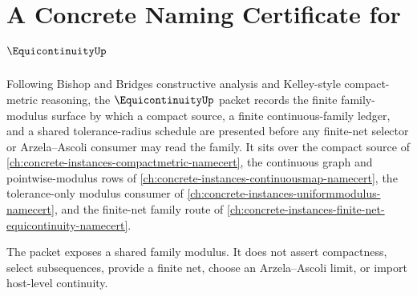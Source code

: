 \chapter{A Concrete Naming Certificate for $\EquicontinuityUp$}
\label{ch:concrete-instances-equicontinuity-namecert}

Following Bishop and Bridges constructive analysis and Kelley-style compact-metric reasoning, the $\EquicontinuityUp$ packet records the finite family-modulus surface by which a compact source, a finite continuous-family ledger, and a shared tolerance-radius schedule are presented before any finite-net selector or Arzela--Ascoli consumer may read the family. It sits over the compact source of \autoref{ch:concrete-instances-compactmetric-namecert}, the continuous graph and pointwise-modulus rows of \autoref{ch:concrete-instances-continuousmap-namecert}, the tolerance-only modulus consumer of \autoref{ch:concrete-instances-uniformmodulus-namecert}, and the finite-net family route of \autoref{ch:concrete-instances-finite-net-equicontinuity-namecert}.

The packet exposes a shared family modulus. It does not assert compactness, select subsequences, provide a finite net, choose an Arzela--Ascoli limit, or import host-level continuity.

